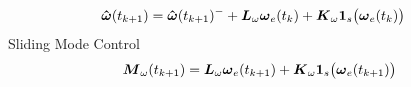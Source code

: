 \begin{nomenclature}
\begin{subequations}
\begin{align}
    \boldsymbol{\hat{\omega}}(t_{k+1}) &= \boldsymbol{\hat{\omega}}(t_{k+1})^- + \boldsymbol{L}_{\omega} \boldsymbol{\omega}_e(t_{k}) + \boldsymbol{K}_{\omega}\boldsymbol{1}_s \big(\boldsymbol{\omega}_e(t_{k}) \big)
  \end{align}
\end{subequations}
Sliding Mode Control
\begin{equation}
  \boldsymbol{M}_{\omega}(t_{k+1}) = \boldsymbol{L}_{\omega} \boldsymbol{\omega}_e(t_{k+1}) + \boldsymbol{K}_{\omega}\boldsymbol{1}_s \big(\boldsymbol{\omega}_e(t_{k+1}) \big)
\end{equation}


\end{nomenclature}

